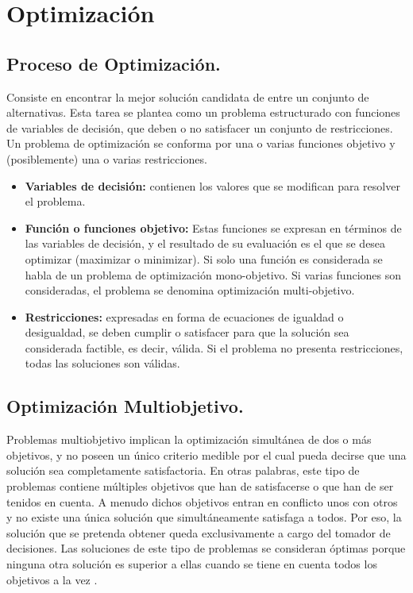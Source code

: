 \chapter{Optimización}
\label{chap3}
\ifpdf
    \graphicspath{{Chapter3/Chapter3Figs/PNG/}{Chapter3/Chapter3Figs/PDF/}{Chapter3/Chapter3Figs/}}
\else
    \graphicspath{{Chapter3/Chapter3Figs/EPS/}{Chapter3/Chapter3Figs/}}
\fi


\section{Proceso de Optimización.}
\label{sec:procOpt}

Consiste en encontrar la mejor solución candidata de entre un conjunto de alternativas. Esta tarea se plantea como un problema estructurado con funciones de variables de decisión, que deben o no satisfacer un conjunto de restricciones.
Un problema de optimización se conforma por una o varias funciones objetivo y (posiblemente) una o varias restricciones.
 \begin{itemize}
     \item \textbf{Variables de decisión:} contienen los valores que se modifican para resolver el problema.
     \item \textbf{Función o funciones objetivo:} Estas funciones se expresan en términos de las variables de decisión, y el resultado de su evaluación es el que se desea optimizar (maximizar o minimizar). Si solo una función es considerada se habla de un problema de optimización mono-objetivo. Si varias funciones son consideradas, el problema se denomina optimización multi-objetivo.
     \item \textbf{Restricciones:} expresadas en forma de ecuaciones de igualdad o desigualdad, se deben cumplir o satisfacer para que la solución sea considerada factible, es decir, válida. Si el problema no presenta restricciones, todas las soluciones son válidas.
 \end{itemize}


\section{Optimización Multiobjetivo.}
\label{sec:multiobj}

Problemas multiobjetivo implican la optimización simultánea de dos o más objetivos, y no poseen un único criterio medible por el cual pueda decirse que una solución sea completamente satisfactoria. En otras palabras, este tipo de problemas contiene múltiples objetivos que han de satisfacerse o que han de ser tenidos en cuenta. A menudo dichos objetivos entran en conflicto unos con otros y no existe una única solución que simultáneamente satisfaga a todos.  Por eso, la solución que se pretenda obtener queda exclusivamente a cargo del tomador de decisiones. Las soluciones de este tipo de problemas se consideran óptimas porque ninguna otra solución es superior a ellas cuando se tiene en cuenta todos los objetivos a la vez \cite{nesmachnow2004version}.

